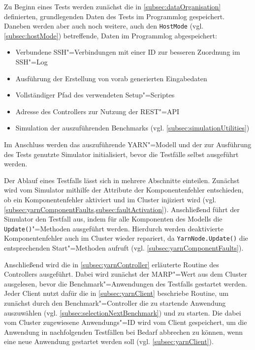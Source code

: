 Zu Beginn eines Tests werden zunächst die in \cref{subsec:dataOrganisation} definierten, grundlegenden Daten des Tests im Programmlog gespeichert.
Daneben werden aber auch noch weitere, auch den \texttt{HostMode} (vgl. \cref{subsec:hostMode}) betreffende, Daten im Programmlog abgespeichert:

\begin{itemize}
    \item Verbundene SSH"=Verbindungen mit einer ID zur besseren Zuordnung im SSH"=Log
    \item Ausführung der Erstellung von vorab generierten Eingabedaten
    \item Vollständiger Pfad des verwendeten Setup"=Scriptes
    \item Adresse des Controllers zur Nutzung der REST"=API
    \item Simulation der auszuführenden Benchmarks (vgl. \cref{subsec:simulationUtilities})
\end{itemize}

Im Anschluss werden das auszuführende YARN"=Modell und der zur Ausführung des Tests genutzte Simulator initialisiert, bevor die Testfälle selbst ausgeführt werden.

Der Ablauf eines Testfalls lässt sich in mehrere Abschnitte einteilen.
Zunächst wird vom Simulator mithilfe der Attribute der Komponentenfehler entschieden, ob ein Komponentenfehler aktiviert und im Cluster injiziert wird (vgl. \cref{subsec:yarnComponentFaults,subsec:faultActivation}).
Anschließend führt der Simulator den Testfall aus, indem für alle Komponenten des Modells die \texttt{Update()}"=Methoden ausgeführt werden.
Hierdurch werden deaktivierte Komponentenfehler auch im Cluster wieder repariert, da \texttt{YarnNode.Update()} die entsprechenden Start"=Methoden aufruft (vgl. \cref{subsec:yarnComponentFaults}).

Anschließend wird die in \cref{subsec:yarnController} erläuterte Routine des Controllers ausgeführt.
Dabei wird zunächst der \gls{MARP}"=Wert aus dem Cluster ausgelesen, bevor die Benchmark"=Anwendungen des Testfalls gestartet werden.
Jeder Client nutzt dafür die in \cref{subsec:yarnClient} beschriebe Routine, um zunächst durch den Benchmark"=Controller die zu startende Anwendung auszuwählen (vgl. \cref{subsec:selectionNextBenchmark}) und zu starten.
Die dabei vom Cluster zugewiesene Anwendungs"=ID wird vom Client gespeichert, um die Anwendung in nachfolgenden Testfällen bei Bedarf abbrechen zu können, wenn eine neue Anwendung gestartet werden soll (vgl. \cref{subsec:yarnClient}).

